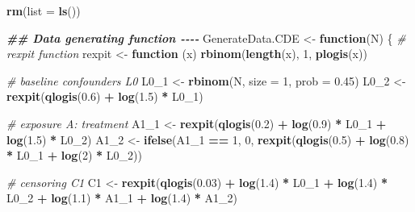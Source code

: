 \documentclass[
]{book}
\newenvironment{Shaded}{\begin{snugshade}}{\end{snugshade}}
\newcommand{\AttributeTok}[1]{\textcolor[rgb]{0.13,0.29,0.53}{#1}}
\newcommand{\CommentTok}[1]{\textcolor[rgb]{0.56,0.35,0.01}{\textit{#1}}}
\newcommand{\ControlFlowTok}[1]{\textcolor[rgb]{0.13,0.29,0.53}{\textbf{#1}}}
\newcommand{\DecValTok}[1]{\textcolor[rgb]{0.00,0.00,0.81}{#1}}
\newcommand{\DocumentationTok}[1]{\textcolor[rgb]{0.56,0.35,0.01}{\textbf{\textit{#1}}}}
\newcommand{\FloatTok}[1]{\textcolor[rgb]{0.00,0.00,0.81}{#1}}
\newcommand{\FunctionTok}[1]{\textcolor[rgb]{0.13,0.29,0.53}{\textbf{#1}}}
\newcommand{\NormalTok}[1]{#1}
\newcommand{\OtherTok}[1]{\textcolor[rgb]{0.56,0.35,0.01}{#1}}
\newcommand{\SpecialCharTok}[1]{\textcolor[rgb]{0.81,0.36,0.00}{\textbf{#1}}}
\begin{document}
\begin{Shaded}
\begin{Highlighting}[]
\FunctionTok{rm}\NormalTok{(}\AttributeTok{list =} \FunctionTok{ls}\NormalTok{())}

\DocumentationTok{\#\# Data generating function {-}{-}{-}{-}}
\NormalTok{GenerateData.CDE }\OtherTok{\textless{}{-}} \ControlFlowTok{function}\NormalTok{(N) \{ }
  \CommentTok{\# rexpit function}
\NormalTok{  rexpit }\OtherTok{\textless{}{-}} \ControlFlowTok{function}\NormalTok{ (x) }\FunctionTok{rbinom}\NormalTok{(}\FunctionTok{length}\NormalTok{(x), }\DecValTok{1}\NormalTok{, }\FunctionTok{plogis}\NormalTok{(x))}
  
  \CommentTok{\# baseline confounders L0}
\NormalTok{  L0\_1 }\OtherTok{\textless{}{-}} \FunctionTok{rbinom}\NormalTok{(N, }\AttributeTok{size =} \DecValTok{1}\NormalTok{, }\AttributeTok{prob =} \FloatTok{0.45}\NormalTok{) }
\NormalTok{  L0\_2 }\OtherTok{\textless{}{-}} \FunctionTok{rexpit}\NormalTok{(}\FunctionTok{qlogis}\NormalTok{(}\FloatTok{0.6}\NormalTok{) }\SpecialCharTok{+} \FunctionTok{log}\NormalTok{(}\FloatTok{1.5}\NormalTok{) }\SpecialCharTok{*}\NormalTok{ L0\_1) }
  
  \CommentTok{\# exposure A: treatment}
\NormalTok{  A1\_1 }\OtherTok{\textless{}{-}} \FunctionTok{rexpit}\NormalTok{(}\FunctionTok{qlogis}\NormalTok{(}\FloatTok{0.2}\NormalTok{) }\SpecialCharTok{+} \FunctionTok{log}\NormalTok{(}\FloatTok{0.9}\NormalTok{) }\SpecialCharTok{*}\NormalTok{ L0\_1  }\SpecialCharTok{+} \FunctionTok{log}\NormalTok{(}\FloatTok{1.5}\NormalTok{) }\SpecialCharTok{*}\NormalTok{ L0\_2)}
\NormalTok{  A1\_2 }\OtherTok{\textless{}{-}} \FunctionTok{ifelse}\NormalTok{(A1\_1 }\SpecialCharTok{==} \DecValTok{1}\NormalTok{,}
                 \DecValTok{0}\NormalTok{,}
                 \FunctionTok{rexpit}\NormalTok{(}\FunctionTok{qlogis}\NormalTok{(}\FloatTok{0.5}\NormalTok{) }\SpecialCharTok{+} \FunctionTok{log}\NormalTok{(}\FloatTok{0.8}\NormalTok{) }\SpecialCharTok{*}\NormalTok{ L0\_1  }\SpecialCharTok{+} \FunctionTok{log}\NormalTok{(}\DecValTok{2}\NormalTok{) }\SpecialCharTok{*}\NormalTok{ L0\_2))}
  
  \CommentTok{\# censoring C1}
\NormalTok{  C1 }\OtherTok{\textless{}{-}} \FunctionTok{rexpit}\NormalTok{(}\FunctionTok{qlogis}\NormalTok{(}\FloatTok{0.03}\NormalTok{) }\SpecialCharTok{+} \FunctionTok{log}\NormalTok{(}\FloatTok{1.4}\NormalTok{) }\SpecialCharTok{*}\NormalTok{ L0\_1  }\SpecialCharTok{+} \FunctionTok{log}\NormalTok{(}\FloatTok{1.4}\NormalTok{) }\SpecialCharTok{*}\NormalTok{ L0\_2 }\SpecialCharTok{+} 
                 \FunctionTok{log}\NormalTok{(}\FloatTok{1.1}\NormalTok{) }\SpecialCharTok{*}\NormalTok{ A1\_1 }\SpecialCharTok{+} \FunctionTok{log}\NormalTok{(}\FloatTok{1.4}\NormalTok{) }\SpecialCharTok{*}\NormalTok{ A1\_2)}
  

\end{Highlighting}
\end{Shaded}
\end{document}
